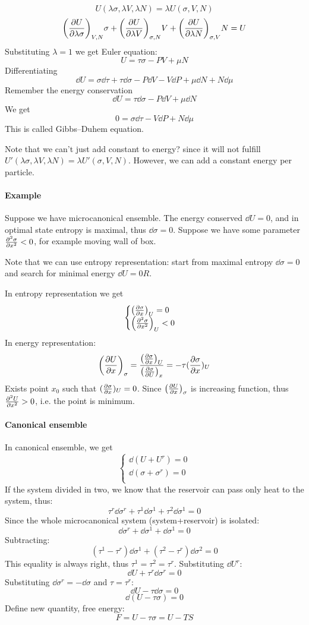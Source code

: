 $$U(\lambda \sigma, \lambda V, \lambda N) = \lambda U (\sigma,  V,  N) $$
$$\qty(\pdv{U}{\lambda \sigma})_{V, N} \sigma + \qty(\pdv{U}{\lambda V})_{\sigma, N} V + \qty(\pdv{U}{\lambda N})_{\sigma, V} N  =U$$
Substituting $\lambda=1$ we get Euler equation:
$$U = \tau \sigma - PV + \mu N $$
Differentiating
$$\dd{U} = \sigma \dd{\tau} + \tau \dd{\sigma} -P\dd{V} -V\dd{P} + \mu \dd{N} + N\dd{\mu}$$
Remember the energy conservation
$$\dd{U} = \tau \dd{\sigma} - P \dd{V} + \mu\dd{N}$$
We get
$$0 = \sigma \dd{\tau} - V\dd{P} + N \dd{\mu}$$
This is called Gibbs–Duhem equation.

Note that we can't just add constant to energy? since it will not fulfill $U'(\lambda\sigma, \lambda V, \lambda N) = \lambda U'(\sigma, V, N)$. However, we can add a constant energy per particle.

\paragraph{Example}
Suppose we have microcanonical ensemble. The energy conserved $\dd{U} = 0$, and in optimal state entropy is maximal, thus $\dd{\sigma}=0$. Suppose we have some parameter $\pdv[2]{\sigma}{x} < 0$, for example moving wall of box.

Note that we can use entropy representation: start from maximal entropy $\dd{\sigma}=0$ and search for minimal energy $\dd{U}=0R$.

In entropy representation we get
$$\begin{cases}
\qty(\pdv{\sigma}{x})_U = 0\\
\qty(\pdv[2]{\sigma}{x})_U < 0\\
\end{cases}$$
In energy representation:
$$\qty(\pdv{U}{x})_\sigma = \frac{\qty(\pdv{\sigma}{x})_U}{\qty(\pdv{\sigma}{U})_x} = -\tau (\pdv{\sigma}{x})_U$$
Exists point $x_0$ such that $(\pdv{\sigma}{x})_U=0$. Since $\qty(\pdv{U}{x})_\sigma$ is increasing function, thus $\pdv[2]{U}{x}>0$, i.e. the point is minimum.

\paragraph{Canonical ensemble}
In canonical ensemble, we get
$$\begin{cases}
\dd{(U+U^r)} = 0\\
\dd{(\sigma+\sigma^r)} = 0\\
\end{cases}$$
If the system divided in two, we know that the reservoir can pass only heat to the system, thus:
$$\tau^r \dd{\sigma^r}+\tau^1 \dd{\sigma^1}+\tau^2 \dd{\sigma^1}=0$$
Since the whole microcanonical system (system+reservoir) is isolated:
$$\dd{\sigma^r}+\dd{\sigma^1}+ \dd{\sigma^1}=0$$
Subtracting:
$$(\tau^1-\tau^r) \dd{\sigma^1}+(\tau^2-\tau^r) \dd{\sigma^2}=0$$
This equality is always right, thus $\tau^1=\tau^2=\tau^r$.
Substituting $\dd{U^r}$:
$$\dd{U} + \tau^{r} \dd{\sigma^r} = 0$$
Substituting $\dd{\sigma^r} = -\dd{\sigma}$ and $\tau=\tau^r$:
$$\dd{U} - \tau \dd{\sigma} = 0$$ 
$$\dd{(U -\tau\sigma)}  = 0$$ 
Define new quantity, free energy:
$$F = U - \tau \sigma = U - TS$$

